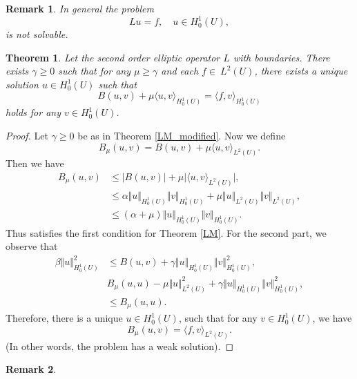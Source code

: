 \documentclass{article}
\newtheorem{theorem}{Theorem}[section]
\newtheorem{remark}{Remark}[section]
\numberwithin{equation}{section}
\begin{document}
\begin{remark}
In general the problem
\begin{equation*}
Lu=f,\quad u\in H_0^1(U),
\end{equation*}
is not solvable. 
\end{remark}

\begin{theorem}
Let the second order elliptic operator $L$ with boundaries. There exists $\gamma\geq 0$ such that for any $\mu\geq\gamma$ and each $f\in\ L^2(U)$, there exists a unique solution $u\in H_0^1(U)$ such that
\begin{equation*}
B(u,v)+\mu\langle u,v\rangle_{H_0^1(U)}=\langle f, v\rangle_{H_0^1(U)}
\end{equation*}
holds for any $v\in H_0^1(U)$. 
\end{theorem}

\begin{proof}
Let $\gamma\geq 0$ be as in Theorem \ref{LM_modified}. Now we define
\begin{equation*}
B_\mu(u,v) = B(u,v) +\mu\langle u,v\rangle_{L^2(U)}.
\end{equation*}
Then we have
\begin{align*}
B_\mu(u,v)&\leq \vert B(u,v)\vert+\mu\vert\langle u,v\rangle_{L^2(U)}\vert,\\
&\leq\alpha\Vert u \Vert_{H_0^1(U)}\Vert v\Vert_{H_0^1(U)}+\mu \Vert u\Vert_{L^2(U)}\Vert v\Vert_{L^2(U)},\\
& \leq (\alpha+\mu)\Vert u \Vert_{H_0^1(U)}\Vert v\Vert_{H_0^1(U)}.
\end{align*}
Thus satisfies the first condition for Theorem \ref{LM}. For the second part, we observe that
\begin{align*}
\beta\Vert u \Vert_{H_0^1(U)}^2&\leq B(u,v)+\gamma\Vert u \Vert_{H_0^1(U)}\Vert v\Vert_{H_0^1(U)}^2,\\
& B_\mu(u,u)-\mu\Vert u\Vert_{L^2(U)}^2+\gamma\Vert u \Vert_{H_0^1(U)}\Vert v\Vert_{H_0^1(U)}^2,\\
&\leq B_\mu(u,u).
\end{align*}
Therefore, there is a unique $u\in H_0^1(U)$, such that for any $v\in H_0^1(U)$, we have
\begin{equation*}
B_\mu(u,v) = \langle f,v\rangle_{L^2(U)}.
\end{equation*}
(In other words, the problem has a weak solution).
\end{proof}

\begin{remark}

\end{remark}
\end{document}
